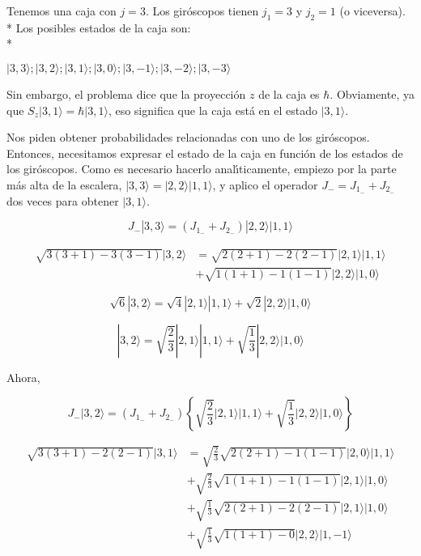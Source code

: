 \begin{solution}
    \begin{parts}
      \item Tenemos una caja con $j=3$. Los giróscopos tienen $j_1=3$ y $j_2=1$ (o viceversa).\\*
      Los posibles estados de la caja son:\\*
     \begin{doublespace}
  \(|3,3\rangle ; |3,2\rangle ; |3,1\rangle ; |3,0\rangle ; |3,-1\rangle ; |3,-2\rangle ; |3,-3\rangle \)
  \end{doublespace}
  
  Sin embargo, el problema dice que la proyecci{\' o}n \(z\) de la caja es $\hbar $. Obviamente, ya que { }\(S_z|3,1\rangle = \hbar  |3,1\rangle\),
  eso significa que la caja est{\' a} en el estado \(|3,1\rangle\).
  
  Nos piden obtener probabilidades relacionadas con uno de los gir{\' o}scopos. Entonces, necesitamos expresar el estado de la caja en funci{\' o}n
  de los estados de los gir{\' o}scopos. Como es necesario hacerlo anal{\' \i}ticamente, empiezo por la parte m{\' a}s alta de la escalera, \(|3,3\rangle
  =|2,2\rangle |1,1\rangle\), y aplico el operador \(J_-=J_{1_-}+J_{2_-}\) dos veces para obtener \(|3,1\rangle\).
  
  \[J_-|3,3\rangle =\left(J_{1_-}+J_{2_-}\right)|2,2\rangle |1,1\rangle\]
  
  \begin{align*}
       \sqrt{3(3+1)-3(3-1)}|3,2\rangle &=\sqrt{2(2+1)-2(2-1)}|2,1\rangle |1,1\rangle \\
  &+\sqrt{1(1+1)-1(1-1)}|2,2\rangle |1,0\rangle\
  \end{align*}
  
  \[\sqrt{6}|3,2\rangle =\sqrt{4}|2,1\rangle |1,1\rangle +\sqrt{2}|2,2\rangle |1,0\rangle\]
  
  \[|3,2\rangle =\sqrt{\frac{2}{3}}|2,1\rangle |1,1\rangle +\sqrt{\frac{1}{3}}|2,2\rangle |1,0\rangle\]
  
  Ahora,
  
  \[J_-|3,2\rangle =\left(J_{1_-}+J_{2_-}\right)\left\{\sqrt{\frac{2}{3}}|2,1\rangle |1,1\rangle +\sqrt{\frac{1}{3}}|2,2\rangle |1,0\rangle \right\}\]
  
  \begin{align*}
      \sqrt{3(3+1)-2(2-1)}|3,1\rangle &=\sqrt{\frac{2}{3}}\sqrt{2(2+1)-1(1-1)}|2,0\rangle |1,1\rangle \\ &+\sqrt{\frac{2}{3}}\sqrt{1(1+1)-1(1-1)}|2,1\rangle|1,0\rangle \\
     &+\sqrt{\frac{1}{3}}\sqrt{2(2+1)-2(2-1)}|2,1\rangle |1,0\rangle \\
      &+\sqrt{\frac{1}{3}}\sqrt{1(1+1)-0}|2,2\rangle |1,-1\rangle
  \end{align*}
  

\end{parts}
\end{solution}
